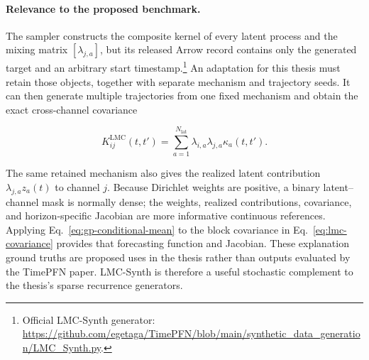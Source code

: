 \paragraph{Relevance to the proposed benchmark.}
The sampler constructs the composite kernel of every latent process and the
mixing matrix $[\lambda_{j,a}]$, but its released Arrow record contains only
the generated target and an arbitrary start timestamp.\footnote{Official
LMC-Synth generator:
\url{https://github.com/egetaga/TimePFN/blob/main/synthetic_data_generation/LMC_Synth.py}.}
An adaptation for this thesis must retain those objects, together with separate
mechanism and trajectory seeds. It can then generate multiple trajectories
from one fixed mechanism and obtain the exact cross-channel covariance

\begin{equation}
K^{\mathrm{LMC}}_{ij}(t,t')
=\sum_{a=1}^{N_{\mathrm{lat}}}
  \lambda_{i,a}\lambda_{j,a}\kappa_a(t,t').
\label{eq:lmc-covariance}
\end{equation}

The same retained mechanism also gives the realized latent contribution
$\lambda_{j,a}z_a(t)$ to channel $j$. Because Dirichlet weights are positive,
a binary latent--channel mask is normally dense; the weights, realized
contributions, covariance, and horizon-specific Jacobian are more informative
continuous references. Applying Eq.~\eqref{eq:gp-conditional-mean} to the
block covariance in Eq.~\eqref{eq:lmc-covariance} provides that forecasting
function and Jacobian. These explanation ground truths are proposed uses in
the thesis rather than outputs evaluated by the TimePFN paper. LMC-Synth is
therefore a useful stochastic complement to the thesis's sparse recurrence
generators.


